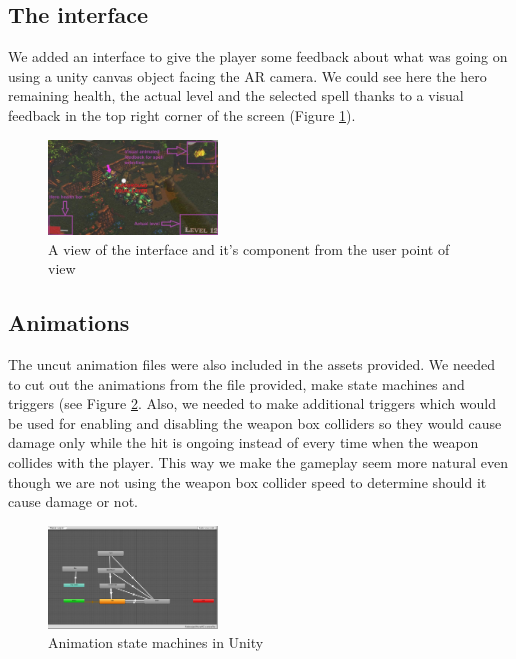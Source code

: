 \documentclass[sigchi, authorversion, screen]{acmart}
\begin{document}
\subsection{The interface}

We added an interface to give the player some feedback about what was going on using a unity canvas object facing the AR camera. We could see here the hero remaining health, the actual level and the selected spell thanks to a visual feedback in the top right corner of the screen (Figure \ref{fig:interface}).

\begin{figure}
    \includegraphics[width=0.4\textwidth]{Images/interface.jpg}
    \caption{A view of the interface and it's component from the user point of view}
    \label{fig:interface}
\end{figure}

\subsection{Animations}

The uncut animation files were also included in the assets provided. We needed to cut out the animations from the file provided, make state machines and triggers (see Figure \ref{fig:animation_state_machine}. Also, we needed to make additional triggers which would be used for enabling and disabling the weapon box colliders so they would cause damage only while the hit is ongoing instead of every time when the weapon collides with the player. This way we make the gameplay seem more natural even though we are not using the weapon box collider speed to determine should it cause damage or not. 

\begin{figure}
    \includegraphics[width=0.4\textwidth]{Images/animation.png}
    \caption{Animation state machines in Unity}
    \label{fig:animation_state_machine}
\end{figure}
\end{document}
